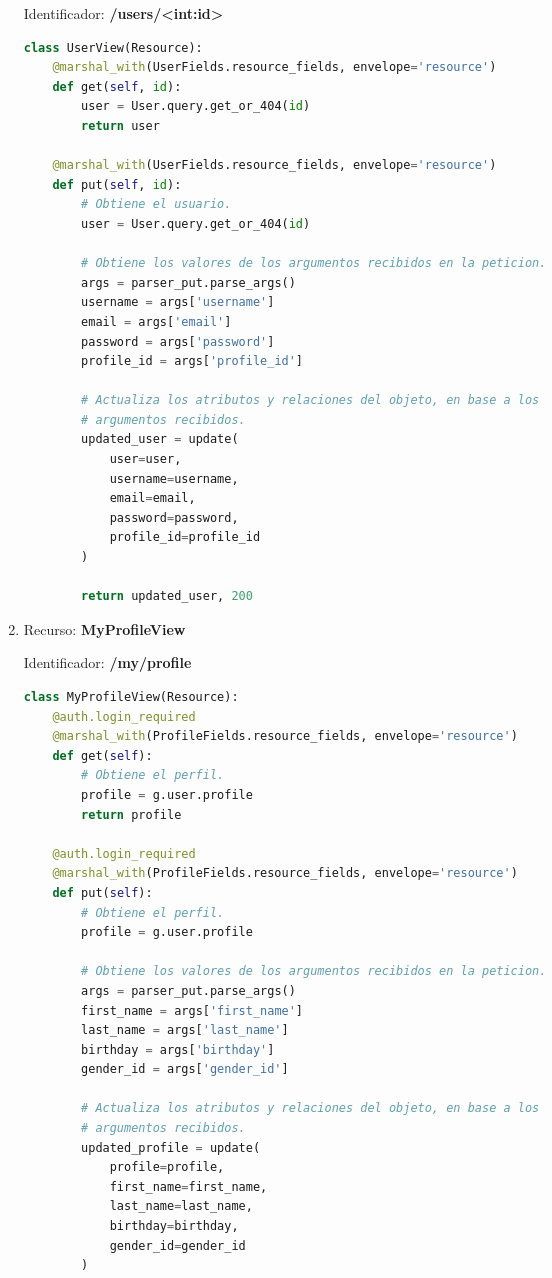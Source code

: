 \begin{enumerate}
Identificador: \textbf{/users/<int:id>}

\begin{lstlisting}[language=Python]
class UserView(Resource):
    @marshal_with(UserFields.resource_fields, envelope='resource')
    def get(self, id):
        user = User.query.get_or_404(id)
        return user

    @marshal_with(UserFields.resource_fields, envelope='resource')
    def put(self, id):
        # Obtiene el usuario.
        user = User.query.get_or_404(id)

        # Obtiene los valores de los argumentos recibidos en la peticion.
        args = parser_put.parse_args()
        username = args['username']
        email = args['email']
        password = args['password']
        profile_id = args['profile_id']

        # Actualiza los atributos y relaciones del objeto, en base a los
        # argumentos recibidos.
        updated_user = update(
            user=user,
            username=username,
            email=email,
            password=password,
            profile_id=profile_id
        )

        return updated_user, 200
\end{lstlisting}

\item Recurso: \textbf{MyProfileView}

Identificador: \textbf{/my/profile}

\begin{lstlisting}[language=Python]
class MyProfileView(Resource):
    @auth.login_required
    @marshal_with(ProfileFields.resource_fields, envelope='resource')
    def get(self):
        # Obtiene el perfil.
        profile = g.user.profile
        return profile

    @auth.login_required
    @marshal_with(ProfileFields.resource_fields, envelope='resource')
    def put(self):
        # Obtiene el perfil.
        profile = g.user.profile

        # Obtiene los valores de los argumentos recibidos en la peticion.
        args = parser_put.parse_args()
        first_name = args['first_name']
        last_name = args['last_name']
        birthday = args['birthday']
        gender_id = args['gender_id']

        # Actualiza los atributos y relaciones del objeto, en base a los
        # argumentos recibidos.
        updated_profile = update(
            profile=profile,
            first_name=first_name,
            last_name=last_name,
            birthday=birthday,
            gender_id=gender_id
        )


\end{lstlisting}
\end{enumerate}

